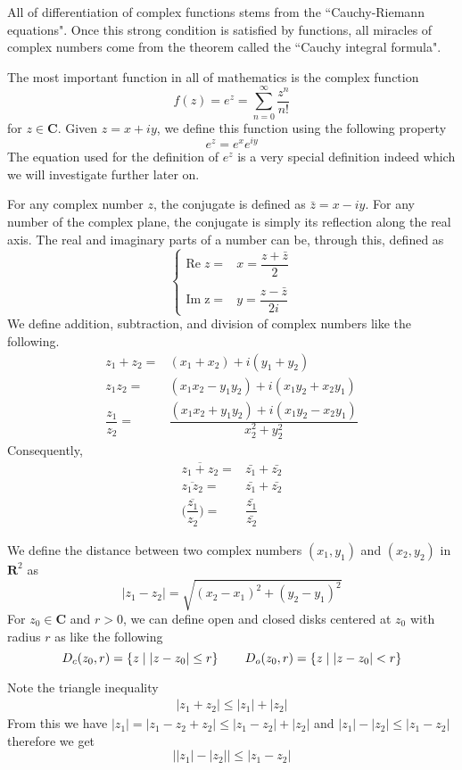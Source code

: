 All of differentiation of complex functions stems from the ``Cauchy-Riemann equations". Once this strong condition is satisfied by functions, all miracles of complex numbers come from the theorem called the ``Cauchy integral formula".
\\
\begin{rmk}
The most important function in all of mathematics is the complex function
\[f(z)=e^{z}=\sum _{n=0}^{\infty }\dfrac{z^{n}}{n!}\]
for $z\in {\bm C}$. Given $z=x+iy$, we define this function using the following property
\[e^{z}=e^{x}e^{iy}\]
The equation used for the definition of $e^{z}$ is a very special definition indeed which we will investigate further later on.
\end{rmk}
\vspace{2ex}
\begin{defi}
For any complex number $z$, the conjugate is defined as $\bar{z}=x-iy$. For any number of the complex plane, the conjugate is simply its reflection along the real axis. The real and imaginary parts of a number can be, through this, defined as
\[\begin{cases}
	\mathrm{Re}\;z=&x=\dfrac{z+\bar{z}}{2}\\\\
	\mathrm{Im\;z}=&y=\dfrac{z-\bar{z}}{2i}
\end{cases}\]
We define addition, subtraction, and division of complex numbers like the following.
\begin{align*}
	z_1+z_2=&(x_1+x_2)+i(y_1+y_2)\\
	z_1z_2=&(x_1x_2-y_1y_2)+i(x_1y_2+x_2y_1)\\
	\dfrac{z_1}{z_2}=&\dfrac{(x_1x_2+y_1y_2)+i(x_1y_2-x_2y_1)}{x_2^2+y_2^2}
\end{align*}
Consequently,
\begin{align*}
	\overline{z_1+z_2}=&\bar{z_1}+\bar{z_2}\\
	\overline{z_1z_2}=&\bar{z_1}+\bar{z_2}\\
	\overline{\Big(\dfrac{z_1}{z_2}\Big)}=&\dfrac{\bar{z_1}}{\bar{z_2}}
\end{align*}
\end{defi}
\vspace{2ex}
\begin{defi}
We define the distance between two complex numbers $(x_1,y_1)$ and $(x_2,y_2)$ in ${\bm R}^2$ as
\[|z_1-z_2|=\sqrt{(x_2-x_1)^2+(y_2-y_1)^2}\]
For $z_{0}\in {\bm C}$ and $r>0$, we can define open and closed disks centered at $z_{0}$ with radius $r$ as like the following
\[D_{c}(z_0,r)=\{z \;|\; |z-z_0|\leq r\}\hspace{5ex}D_{o}(z_0,r)=\{z \;|\; |z-z_0|<r\}\]
\end{defi}
\begin{thm}
Note the triangle inequality
\begin{align*}
|z_1+z_2|\leq |z_1|+|z_2|
\end{align*}
From this we have $|z_1|=|z_1-z_2+z_2|\leq |z_1-z_2|+|z_2|$
and $|z_1|-|z_2|\leq |z_1-z_2|$
therefore we get
\[\big||z_1|-|z_2|\big|\leq |z_1-z_2|\]
\end{thm}
\vspace{2ex}

